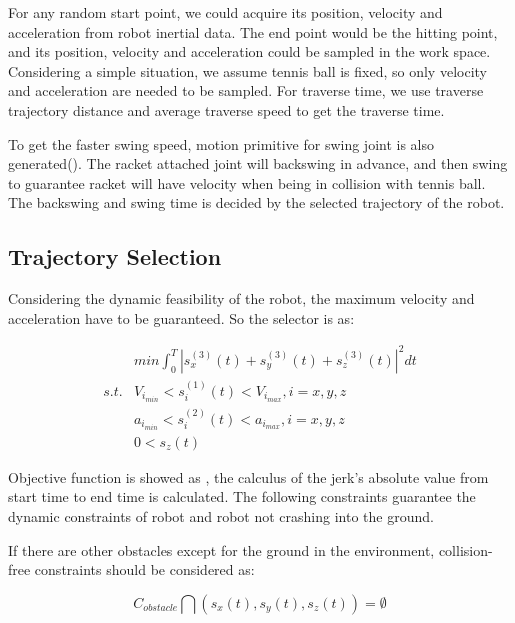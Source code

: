 \documentclass{jarticle}
\begin{document}
For any random start point, we could acquire its position, velocity and acceleration from robot inertial data. The end point would be the hitting point, and its position, velocity and acceleration could be sampled in the work space. Considering a simple situation, we assume tennis ball is fixed, so only velocity and acceleration are needed to be sampled. For traverse time, we use traverse trajectory distance and average traverse speed to get the traverse time.

To get the faster swing speed, motion primitive for swing joint is also generated(). The racket attached joint will backswing in advance, and then swing to guarantee racket will have velocity when being in collision with tennis ball. The backswing and swing time is decided by the selected trajectory of the robot.

\subsection{Trajectory Selection}
Considering the dynamic feasibility of the robot, the maximum velocity and acceleration have to be guaranteed. So the selector is as:

\begin{eqnarray}
  \label{eq:temp3}
 & min{\int_0^T |s^{(3)}_x(t) + s^{(3)}_y(t) + s^{(3)}_z(t)|^2 dt}   \\
  \label{eq:temp4}
s.t. &  V_{i_{min}} < s^{(1)}_i(t) < V_{i_{max}}, i = x, y, z \nonumber \\
  \label{eq:temp5}
 & a_{i_{min}} < s^{(2)}_i(t) < a_{i_{max}}, i = x, y, z \nonumber \\
  \label{eq:temp6}
 & 0 < s_z(t) \nonumber
\end{eqnarray}

Objective function is showed as , the calculus of the jerk’s absolute value from start time to end time is calculated. The following constraints guarantee the dynamic constraints of robot and robot not crashing into the ground.

If there are other obstacles except for the ground in the environment, collision-free constraints should be considered as:

\begin{equation}
  \label{eq:temp7}
  C_{obstacle}\bigcap (s_x(t), s_y(t), s_z(t)) =\emptyset
\end{equation}
\end{document}
